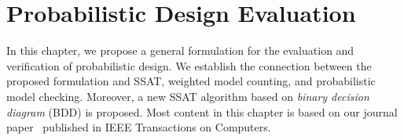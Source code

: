 \chapter{Probabilistic Design Evaluation}
\label{chap:prob-design-eval}

In this chapter, we propose a general formulation for the evaluation and verification of probabilistic design.
We establish the connection between the proposed formulation and SSAT, weighted model counting, and probabilistic model checking.
Moreover, a new SSAT algorithm based on \textit{binary decision diagram} (BDD) is proposed.
Most content in this chapter is based on our journal paper~\cite{LeeTC18ProbDesign} published in IEEE Transactions on Computers.





